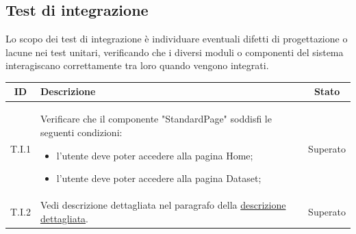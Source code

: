 \newpage
\subsection{Test di integrazione}
\label{subsec:test_integrazione}
Lo scopo dei test di integrazione è individuare eventuali difetti di progettazione o lacune nei test unitari, 
verificando che i diversi moduli o componenti del sistema interagiscano correttamente tra loro quando vengono integrati.
\begin{tabularx}{\textwidth}{|c|X|c|}
\hline
\textbf{ID} & \textbf{Descrizione} & \textbf{Stato}\\
\hline
T.I.1 & Verificare che il componente "StandardPage" soddisfi le seguenti condizioni:
\begin{itemize}%
    \item l'utente deve poter accedere alla pagina Home;
    \item l'utente deve poter accedere alla pagina Dataset;
\end{itemize}
& Superato \\
\hline
T.I.2 & Vedi descrizione dettagliata nel paragrafo della \hyperref[ti:descr_ti2]{descrizione dettagliata}. 
& Superato \\
\hline
\end{tabularx}

